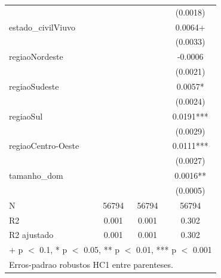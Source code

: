 \begin{table}
\begin{tabular}[t]{lccc}
 &  &  & (0.0018)\\
estado\_civilViuvo &  &  & 0.0064+\\
 &  &  & (0.0033)\\
regiaoNordeste &  &  & -0.0006\\
 &  &  & (0.0021)\\
regiaoSudeste &  &  & 0.0057*\\
 &  &  & (0.0024)\\
regiaoSul &  &  & 0.0191***\\
 &  &  & (0.0029)\\
regiaoCentro-Oeste &  &  & 0.0111***\\
 &  &  & (0.0027)\\
tamanho\_dom &  &  & 0.0016**\\
 &  &  & (0.0005)\\
\midrule
N & 56794 & 56794 & 56794\\
R2 & 0.001 & 0.001 & 0.302\\
R2 ajustado & 0.001 & 0.001 & 0.302\\
\bottomrule
\multicolumn{4}{l}{\rule{0pt}{1em}+ p $<$ 0.1, * p $<$ 0.05, ** p $<$ 0.01, *** p $<$ 0.001}\\
\multicolumn{4}{l}{\rule{0pt}{1em}Erros-padrao robustos HC1 entre parenteses.}\\
\end{tabular}
\end{table}
